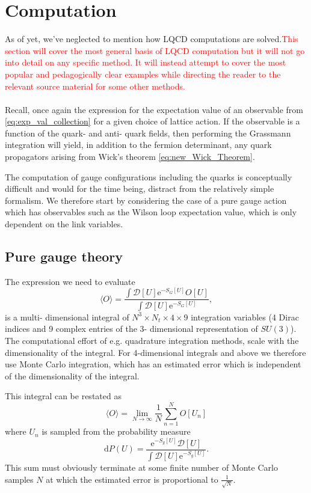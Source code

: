 \documentclass[a4paper,10pt]{article}
\begin{document}
\section{Computation}
As of yet, we've neglected to mention how LQCD computations are solved.\textcolor{red}{This section will cover the most general basis of LQCD computation but it will not go into detail on any specific method. It will instead attempt to cover the most popular and pedagogically clear examples while directing the reader to the relevant source material for some other methods.} \\\\Recall, once again the expression for the expectation value of an observable from \eqref{eq:exp_val_collection} for a given choice of lattice action. If the observable is a function of the quark- and anti- quark fields, then performing the Grassmann integration will yield, in addition to the fermion determinant, any quark propagators arising from Wick's theorem \eqref{eq:new_Wick_Theorem}. \par The computation of gauge configurations including the quarks is conceptually difficult and would for the time being, distract from the relatively simple formalism. We therefore start by considering the case of a pure gauge action which has observables such as the Wilson loop expectation value, which is only dependent on the link variables.
\subsection{Pure gauge theory}
The expression we need to evaluate 
\begin{equation}
\langle O\rangle=\frac{\int \mathcal{D}[U] \mathrm{e}^{-S_{G}[U]} O[U]}{\int \mathcal{D}[U] \mathrm{e}^{-S_{G}[U]}}  ,
\end{equation}
is a multi- dimensional integral of $N^3\times N_t \times 4 \times 9$ integration variables (4 Dirac indices and 9 complex entries of the 3- dimensional representation of $SU(3)$). The computational effort of e.g. quadrature integration methods, scale with the dimensionality of the integral. For 4-dimensional integrals and above we therefore use Monte Carlo integration, which has an estimated error which is independent of the dimensionality of the integral.

This integral can be restated as 
\begin{equation}\label{eq:MC_gauge_sum}
\langle O\rangle=\lim _{N \rightarrow \infty} \frac{1}{N} \sum_{n=1}^{N} O\left[U_{n}\right]
\end{equation}
where $U_{n}$ is sampled from the probability measure
\begin{equation}\label{eq:prob_measure}
\mathrm{d} P(U)=\frac{\mathrm{e}^{-S_g[U]} \mathcal{D}[U]}{\int \mathcal{D}[U] \mathrm{e}^{-S_g[U]}}.
\end{equation}
This sum must obviously terminate at some finite number of Monte Carlo samples $N$ at which the estimated error is proportional to $\frac{1}{\sqrt{N}}$.
\end{document}
